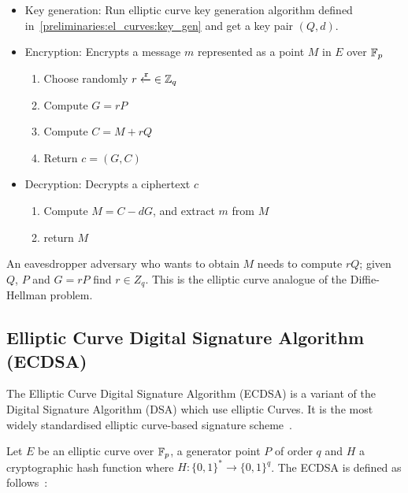 \begin{itemize}
  \item Key generation: Run elliptic curve key generation algorithm defined in~\ref{preliminaries:el_curves:key_gen} and get a key pair $(Q, d)$.
  \item Encryption: Encrypts a message $m$ represented as a point $M$ in $E$ over $\mathbb{F}_p$
    \begin{enumerate}
      \item Choose randomly $r \xleftarrow{\mathtt{r}}{\in \mathbb{Z}_q}$
      \item Compute $G = rP$
      \item Compute $C = M + rQ$
      \item Return $c = (G, C)$
    \end{enumerate}
  \item Decryption: Decrypts a ciphertext $c$
    \begin{enumerate}
      \item Compute $M = C - dG$, and extract $m$ from $M$
      \item return $M$
    \end{enumerate}
\end{itemize}

An eavesdropper adversary who wants to obtain $M$ needs to compute $rQ$; given $Q$, $P$ and $G = rP$ find $r \in Z_q$. This is the elliptic curve analogue of the Diffie-Hellman problem.

\subsection{Elliptic Curve Digital Signature Algorithm (ECDSA)}
\label{preliminaries:sign:el_curves:ecdsa}

The Elliptic Curve Digital Signature Algorithm (ECDSA) is a variant of the Digital Signature Algorithm (DSA) which use elliptic Curves. It is the most widely standardised elliptic curve-based signature scheme~\cite{elliptic_curves_2}.

Let $E$ be an elliptic curve over $\mathbb{F}_p$, a generator point $P$ of order $q$ and $H$ a cryptographic hash function where $H: \{0, 1\}^{*} \rightarrow  \{0, 1\}^{q}$. The ECDSA is defined as follows~\cite{elliptic_curves_2}:

